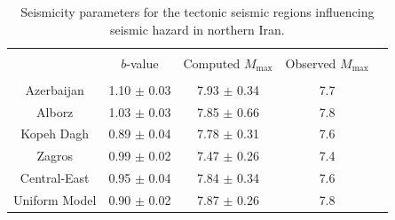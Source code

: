 \begin{table}[t]
    \centering
    \caption{Seismicity parameters for the tectonic seismic regions influencing seismic hazard in northern Iran.}
    \begin{tabular}{ccccc}
        \hline                                                                              \\[-1.6ex]
                        & $b$-value         & Computed $M_{\max}$   & Observed $M_{\max}$   \\[0.6ex]
        \hline                                                                              \\[-1.6ex]
        Azerbaijan      & 1.10 $\pm$ 0.03   & 7.93 $\pm$ 0.34       & 7.7                   \\
        Alborz          & 1.03 $\pm$ 0.03   & 7.85 $\pm$ 0.66       & 7.8                   \\
        Kopeh Dagh      & 0.89 $\pm$ 0.04   & 7.78 $\pm$ 0.31       & 7.6                   \\
        Zagros          & 0.99 $\pm$ 0.02   & 7.47 $\pm$ 0.26       & 7.4                   \\
        Central-East    & 0.95 $\pm$ 0.04   & 7.84 $\pm$ 0.34       & 7.6                   \\
        Uniform Model   & 0.90 $\pm$ 0.02   & 7.87 $\pm$ 0.26       & 7.8                   \\[0.5ex]
        \hline 
    \end{tabular}
    \label{tab:b_value} 
\end{table}

